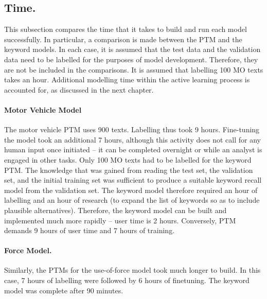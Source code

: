 \subsection{Time.} This subsection compares the time that it takes to build and run each model successfully. In particular, a comparison is made between the PTM and the keyword models. In each case, it is assumed that the test data and the validation data need to be labelled for the purposes of model development. Therefore, they are not be included in the comparisons. It is assumed that labelling 100 MO texts takes an hour. Additional modelling time within the active learning process is accounted for, as discussed in the next chapter.

\paragraph{Motor Vehicle Model} The motor vehicle PTM uses 900 texts. Labelling thus took 9 hours. Fine-tuning the model took an additional 7 hours, although this activity does not call for any human input once initiated – it can be completed overnight or while an analyst is engaged in other tasks. Only 100 MO texts had to be labelled for the keyword PTM. The knowledge that was gained from reading the test set, the validation set, and the initial training set was sufficient to produce a suitable keyword recall model from the validation set. The keyword model therefore required an hour of labelling and an hour of research (to expand the list of keywords so as to include plausible alternatives). Therefore, the keyword model can be built and implemented much more rapidly – user time is 2 hours. Conversely, PTM demands 9 hours of user time and 7 hours of training. 

\paragraph{Force Model.}Similarly, the PTMs for the use-of-force model took much longer to build. In this case, 7 hours of labelling were followed by 6 hours of finetuning. The keyword model was complete after 90 minutes.

